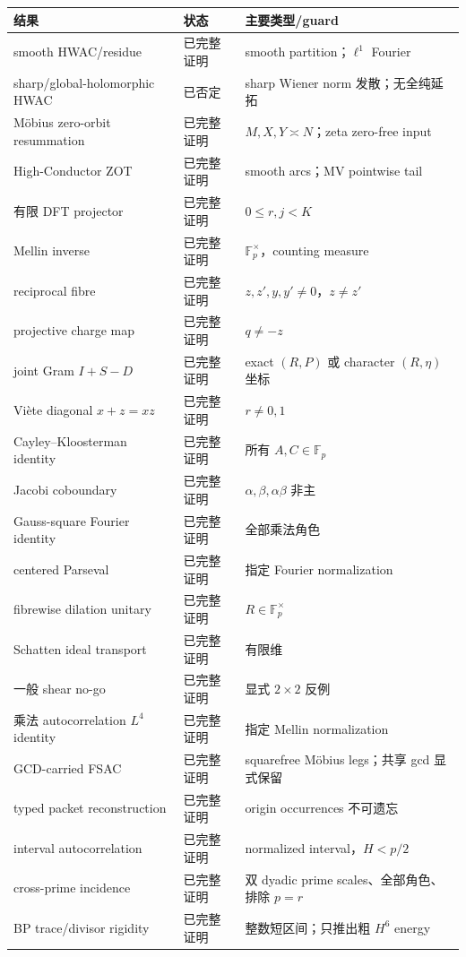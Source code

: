 \documentclass[11pt,a4paper]{ctexart}
\theoremstyle{definition}
\newcommand{\F}{\mathbb F}
\newcommand{\G}{\F_p^\times}
\newcommand{\1}{\mathbf 1}
\begin{document}
\begin{center}
\begin{tabular}{p{}p{}p{}}
\toprule
结果 & 状态 & 主要类型/guard\\
\midrule
smooth HWAC/residue & 已完整证明 & smooth partition；$\ell^1$ Fourier\\
sharp/global-holomorphic HWAC & 已否定 & sharp Wiener norm 发散；无全纯延拓\\
Möbius zero-orbit resummation & 已完整证明 & $M,X,Y\asymp N$；zeta zero-free input\\
High-Conductor ZOT & 已完整证明 & smooth arcs；MV pointwise tail\\
有限 DFT projector & 已完整证明 & $0\le r,j<K$\\
Mellin inverse & 已完整证明 & $\G$，counting measure\\
reciprocal fibre & 已完整证明 & $z,z',y,y'\ne0$，$z\ne z'$\\
projective charge map & 已完整证明 & $q\ne-z$\\
joint Gram $I+S-D$ & 已完整证明 & exact $(R,P)$ 或 character $(R,\eta)$ 坐标\\
Vi\`ete diagonal $x+z=xz$ & 已完整证明 & $r\ne0,1$\\
Cayley--Kloosterman identity & 已完整证明 & 所有 $A,C\in\F_p$\\
Jacobi coboundary & 已完整证明 & $\alpha,\beta,\alpha\beta$ 非主\\
Gauss-square Fourier identity & 已完整证明 & 全部乘法角色\\
centered Parseval & 已完整证明 & 指定 Fourier normalization\\
fibrewise dilation unitary & 已完整证明 & $R\in\G$\\
Schatten ideal transport & 已完整证明 & 有限维\\
一般 shear no-go & 已完整证明 & 显式 $2\times2$ 反例\\
乘法 autocorrelation $L^4$ identity & 已完整证明 & 指定 Mellin normalization\\
GCD-carried FSAC & 已完整证明 & squarefree Möbius legs；共享 gcd 显式保留\\
typed packet reconstruction & 已完整证明 & origin occurrences 不可遗忘\\
interval autocorrelation & 已完整证明 & normalized interval，$H<p/2$\\
cross-prime incidence & 已完整证明 & 双 dyadic prime scales、全部角色、排除 $p=r$\\
BP trace/divisor rigidity & 已完整证明 & 整数短区间；只推出粗 $H^6$ energy\\

\end{tabular}
\end{center}
\end{document}
